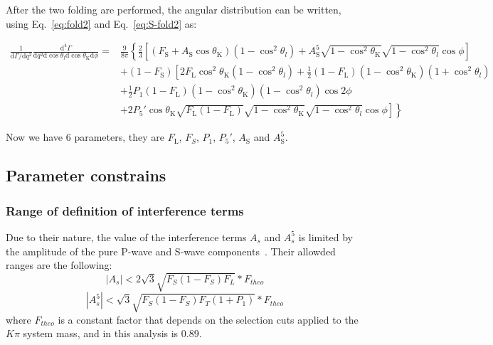 After the two folding are performed, the angular distribution can be
written, using  Eq.~\ref{eq:fold2} and Eq.~\ref{eq:S-fold2} as:

\begin{equation} \label{eq:PDF-f2}
  \begin{split}
  \frac{1}{\mathrm{d}\Gamma/\mathrm{d}q^2}\frac{\mathrm{d}^4\Gamma}{\mathrm{d}q^2 \mathrm{d}\cos\theta_l \mathrm{d}\cos\theta_\mathrm{K} \mathrm{d}\phi} =&\frac{9}{8\pi}\left\{\frac{2}{3}\left[ (F_\mathrm{S}+A_\mathrm{S}\cos\theta_\mathrm{K})\left(1-\cos^2\theta_l\right) + A^5_\mathrm{S}\sqrt{1-\cos^2\theta_\mathrm{K}}\sqrt{1-\cos^2\theta_l}\cos\phi \right] \right.\\
 & + \left(1 - F_\mathrm{S}\right)\left[2F_\mathrm{L}\cos^2\theta_\mathrm{K}\left(1-\cos^2\theta_l\right)+\frac{1}{2}\left(1-F_\mathrm{L}\right)\left(1-\cos^2\theta_\mathrm{K}\right)\left(1+\cos^2\theta_l\right) \right.\\
 & + \frac{1}{2}P_1(1-F_\mathrm{L})(1-\cos^2\theta_\mathrm{K})(1-\cos^2\theta_l)\cos 2\phi \\
 & \left.\left. + 2P_5'\cos\theta_\mathrm{K}\sqrt{F_\mathrm{L}\left(1-F_\mathrm{L}\right)}\sqrt{1-\cos^2\theta_\mathrm{K}}\sqrt{1-\cos^2\theta_l}\cos\phi\right]\right\}
 \end{split}
\end{equation}

Now we have 6 parameters, they are $F_\mathrm{L}$, $F_S$, $P_1$, $P_5'$, $A_\mathrm{S}$
and $A^5_\mathrm{S}$.

\subsection{Parameter constrains}
\label{sec:bound}

\subsubsection{Range of definition of interference terms}
\label{sec:As5.range}
Due to their nature, the value of the interference terms $A_s$ and $A_s^5$ is limited by the amplitude of the pure P-wave and S-wave components~\cite{Genon:Swave}. Their allowded ranges are the following:
\begin{equation} \label{eq:As.range}
  |A_s|<2\sqrt{3}\sqrt{F_S(1-F_S)F_L}*F_{theo}
\end{equation}
\begin{equation} \label{eq:As5.range}
  |A^5_s|<\sqrt{3}\sqrt{F_S(1-F_S)F_T(1+P_1)}*F_{theo}
\end{equation}
where $F_{theo}$ is a constant factor that depends on the selection cuts applied to the $K\pi$ system mass, and in this analysis is 0.89.

